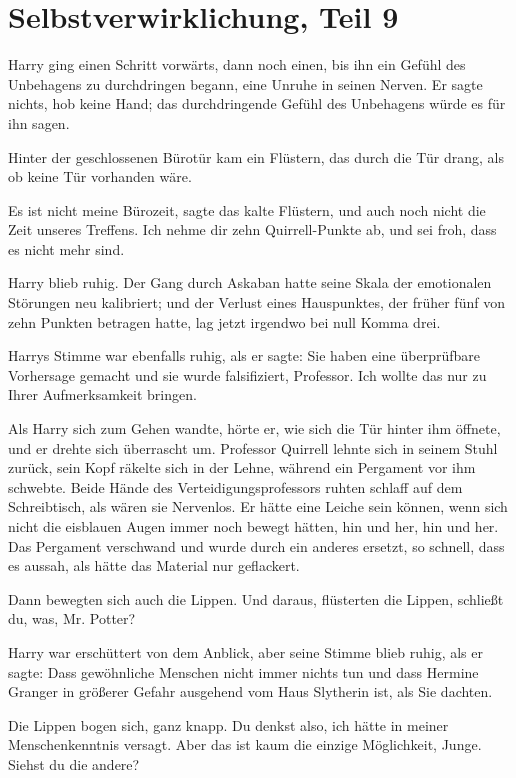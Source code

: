 \chapter{Selbstverwirklichung, Teil 9}

Harry ging einen Schritt vorwärts, dann noch einen, bis ihn ein Gefühl des
Unbehagens zu durchdringen begann, eine Unruhe in seinen Nerven. Er sagte
nichts, hob keine Hand; das durchdringende Gefühl des Unbehagens würde es für
ihn sagen.

Hinter der geschlossenen Bürotür kam ein Flüstern, das durch die Tür drang, als
ob keine Tür vorhanden wäre.

\glqq Es ist nicht meine Bürozeit\grqq{}, sagte das kalte Flüstern, \glqq und
auch noch nicht die Zeit unseres Treffens. Ich nehme dir zehn Quirrell-Punkte
ab, und sei froh, dass es nicht mehr sind.\grqq{}

Harry blieb ruhig. Der Gang durch Askaban hatte seine Skala der emotionalen
Störungen neu kalibriert; und der Verlust eines Hauspunktes, der früher fünf von
zehn Punkten betragen hatte, lag jetzt irgendwo bei null Komma drei.

Harrys Stimme war ebenfalls ruhig, als er sagte: \glqq Sie haben eine
überprüfbare Vorhersage gemacht und sie wurde falsifiziert, Professor. Ich
wollte das nur zu Ihrer Aufmerksamkeit bringen.\grqq{}

Als Harry sich zum Gehen wandte, hörte er, wie sich die Tür hinter ihm öffnete,
und er drehte sich überrascht um. Professor Quirrell lehnte sich in seinem Stuhl
zurück, sein Kopf räkelte sich in der Lehne, während ein Pergament vor ihm
schwebte. Beide Hände des Verteidigungsprofessors ruhten schlaff auf dem
Schreibtisch, als wären sie Nervenlos. Er hätte eine Leiche sein können, wenn
sich nicht die eisblauen Augen immer noch bewegt hätten, hin und her, hin und
her. Das Pergament verschwand und wurde durch ein anderes ersetzt, so schnell,
dass es aussah, als hätte das Material nur geflackert.

Dann bewegten sich auch die Lippen. \glqq Und daraus\grqq{}, flüsterten die
Lippen, \glqq schließt du, was, Mr. Potter?\grqq{}

Harry war erschüttert von dem Anblick, aber seine Stimme blieb ruhig, als er
sagte: \glqq Dass gewöhnliche Menschen nicht immer nichts tun und dass Hermine
Granger in größerer Gefahr ausgehend vom Haus Slytherin ist, als Sie
dachten.\grqq{}

Die Lippen bogen sich, ganz knapp. \glqq Du denkst also, ich hätte in meiner
Menschenkenntnis versagt. Aber das ist kaum die einzige Möglichkeit, Junge.
Siehst du die andere?\grqq{}

